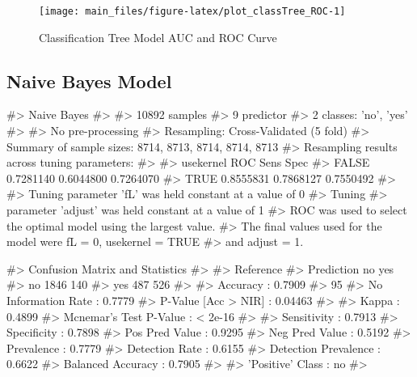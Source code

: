 \begin{Schunk}
\begin{figure}[H]

{\centering \texttt{[image: main\_files/figure-latex/plot\_classTree\_ROC-1]} 

}

\caption[Classification Tree Model AUC and ROC Curve]{Classification Tree Model AUC and ROC Curve}\label{fig:plot_classTree_ROC}
\end{figure}
\end{Schunk}

\hypertarget{naive-bayes-model}{%
\subsection{Naive Bayes Model}\label{naive-bayes-model}}

\begin{Schunk}
\begin{Soutput}
#> Naive Bayes 
#> 
#> 10892 samples
#>     9 predictor
#>     2 classes: 'no', 'yes' 
#> 
#> No pre-processing
#> Resampling: Cross-Validated (5 fold) 
#> Summary of sample sizes: 8714, 8713, 8714, 8714, 8713 
#> Resampling results across tuning parameters:
#> 
#>   usekernel  ROC        Sens       Spec     
#>   FALSE      0.7281140  0.6044800  0.7264070
#>    TRUE      0.8555831  0.7868127  0.7550492
#> 
#> Tuning parameter 'fL' was held constant at a value of 0
#> Tuning
#>  parameter 'adjust' was held constant at a value of 1
#> ROC was used to select the optimal model using the largest value.
#> The final values used for the model were fL = 0, usekernel = TRUE
#>  and adjust = 1.
\end{Soutput}
\end{Schunk}

\begin{Schunk}
\begin{Soutput}
#> Confusion Matrix and Statistics
#> 
#>           Reference
#> Prediction   no  yes
#>        no  1846  140
#>        yes  487  526
#>                                           
#>                Accuracy : 0.7909          
#>                  95%
#>     No Information Rate : 0.7779          
#>     P-Value [Acc > NIR] : 0.04463         
#>                                           
#>                   Kappa : 0.4899          
#>  Mcnemar's Test P-Value : < 2e-16         
#>                                           
#>             Sensitivity : 0.7913          
#>             Specificity : 0.7898          
#>          Pos Pred Value : 0.9295          
#>          Neg Pred Value : 0.5192          
#>              Prevalence : 0.7779          
#>          Detection Rate : 0.6155          
#>    Detection Prevalence : 0.6622          
#>       Balanced Accuracy : 0.7905          
#>                                           
#>        'Positive' Class : no              
#> 
\end{Soutput}
\end{Schunk}

